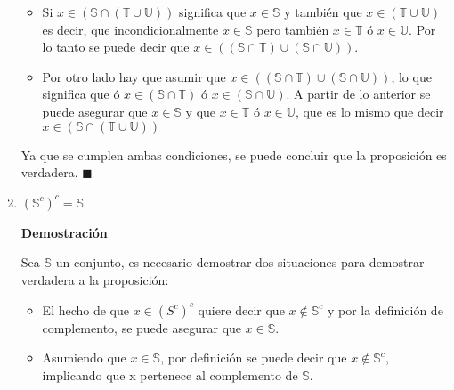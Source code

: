 \documentclass[a4paper,dvipsnames]{book}
\begin{document}
\begin{enumerate}
                    \begin{itemize}
                        \item Si $x\in\left( \mathbb S\cap\left( \mathbb
                            T\cup\mathbb U \right) \right)$ significa que
                            $x\in\mathbb S$ y también que $x\in\left( \mathbb
                            T\cup\mathbb U \right)$ es decir, que
                            incondicionalmente $x\in\mathbb S$ pero también
                            $x\in\mathbb T$ ó $x\in\mathbb U$. Por lo tanto se
                            puede decir que $x\in\left( \left( \mathbb
                            S\cap\mathbb T \right)\cup\left( \mathbb
                            S\cap\mathbb U\right) \right)$.
                        \item Por otro lado hay que asumir que $x\in\left(
                            \left( \mathbb S\cap\mathbb T\right)\cup\left(
                            \mathbb S\cap\mathbb U\right) \right)$, lo que
                            significa que ó $x\in\left( \mathbb S\cap\mathbb T
                            \right)$ ó $x\in\left( \mathbb S\cap\mathbb U
                            \right)$. A partir de lo anterior se puede asegurar
                            que $x\in\mathbb S$ y que $x\in\mathbb T$ ó
                            $x\in\mathbb U$, que es lo mismo que decir
                            $x\in\left( \mathbb S\cap\left( \mathbb
                            T\cup\mathbb U \right) \right)$
                    \end{itemize}

                    Ya que se cumplen ambas condiciones, se puede concluir que
                    la proposición es verdadera. $\blacksquare$

                \item $(\mathbb S^{c})^{c} = \mathbb S$

                \textbf{Demostración}

                Sea $\mathbb S$ un conjunto, es necesario demostrar dos
                situaciones para demostrar verdadera a la proposición:

                \begin{itemize}
                    \item El hecho de que $x\in(S^{c})^{c}$ quiere decir que
                        $x\notin\mathbb S^{c}$ y por la definición de
                        complemento, se puede asegurar que $x\in\mathbb S$.
                    \item Asumiendo que $x\in\mathbb S$, por definición se
                        puede decir que $x\notin\mathbb S^{c}$, implicando que
                        x pertenece al complemento de $\mathbb S$.
                \end{itemize}


\end{enumerate}
\end{document}
